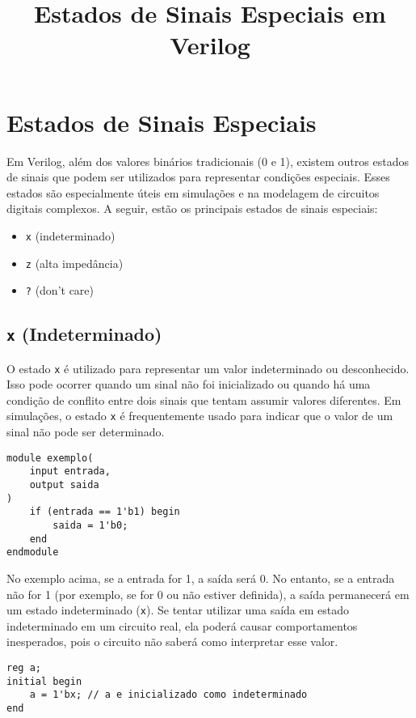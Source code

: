 \documentclass{article}
\title{Estados de Sinais Especiais em Verilog}
\author{}
\date{}
\begin{document}
\maketitle

\section*{Estados de Sinais Especiais}

Em Verilog, além dos valores binários tradicionais (0 e 1), existem outros estados de sinais que podem ser utilizados para representar condições especiais. Esses estados são especialmente úteis em simulações e na modelagem de circuitos digitais complexos. A seguir, estão os principais estados de sinais especiais:

\begin{itemize}
    \item \texttt{x} (indeterminado)
    \item \texttt{z} (alta impedância)
    \item \texttt{?} (don't care)
\end{itemize}

\subsection*{\texttt{x} (Indeterminado)}
O estado \texttt{x} é utilizado para representar um valor indeterminado ou desconhecido. Isso pode ocorrer quando um sinal não foi inicializado ou quando há uma condição de conflito entre dois sinais que tentam assumir valores diferentes. Em simulações, o estado \texttt{x} é frequentemente usado para indicar que o valor de um sinal não pode ser determinado.

\begin{lstlisting}
module exemplo(
    input entrada,
    output saida
)
    if (entrada == 1'b1) begin
        saida = 1'b0;
    end
endmodule
\end{lstlisting}

No exemplo acima, se a entrada for 1, a saída será 0. No entanto, se a entrada não for 1 (por exemplo, se for 0 ou não estiver definida), a saída permanecerá em um estado indeterminado (\texttt{x}). Se tentar utilizar uma saída em estado indeterminado em um circuito real, ela poderá causar comportamentos inesperados, pois o circuito não saberá como interpretar esse valor.

\begin{lstlisting}
reg a;
initial begin
    a = 1'bx; // a e inicializado como indeterminado
end
\end{lstlisting}
\end{document}

